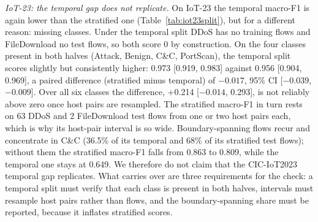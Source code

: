 \emph{IoT-23: the temporal gap does not replicate.} On IoT-23 the temporal macro-F1 is again lower than the stratified one (Table~\ref{tab:iot23split}), but for a different reason: missing classes. Under the temporal split DDoS has no training flows and FileDownload no test flows, so both score 0 by construction. On the four classes present in both halves (Attack, Benign, C\&C, PortScan), the temporal split scores slightly but consistently higher: 0.973 [0.919, 0.983] against 0.956 [0.904, 0.969], a paired difference (stratified minus temporal) of $-0.017$, 95\% CI [$-0.039$, $-0.009$]. Over all six classes the difference, +0.214 [$-0.014$, 0.293], is not reliably above zero once host pairs are resampled. The stratified macro-F1 in turn rests on 63 DDoS and 2 FileDownload test flows from one or two host pairs each, which is why its host-pair interval is so wide. Boundary-spanning flows recur and concentrate in C\&C (36.5\% of its temporal and 68\% of its stratified test flows); without them the stratified macro-F1 falls from 0.863 to 0.809, while the temporal one stays at 0.649. We therefore do not claim that the CIC-IoT2023 temporal gap replicates. What carries over are three requirements for the check: a temporal split must verify that each class is present in both halves, intervals must resample host pairs rather than flows, and the boundary-spanning share must be reported, because it inflates stratified scores.
